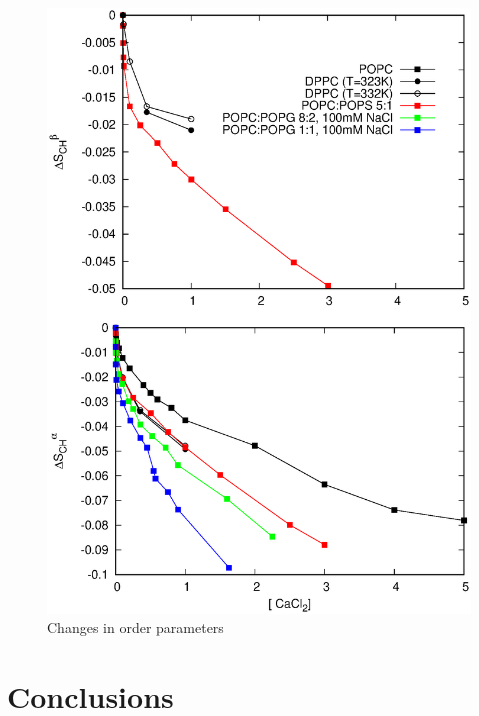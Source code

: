 \documentclass[aps,prl,superscriptaddress,twocolumn]{revtex4}
\begin{document}
\begin{figure}[]
  \centering
  \includegraphics[width=17.2cm]{../Figs/CHANGESwithCaClBELOW1M.eps}
  \caption{\label{OrderParameterCHANGESWithCaClBELOW1M}
    Changes in order parameters
  }
\end{figure}




\section{Conclusions}

%
\end{document}
